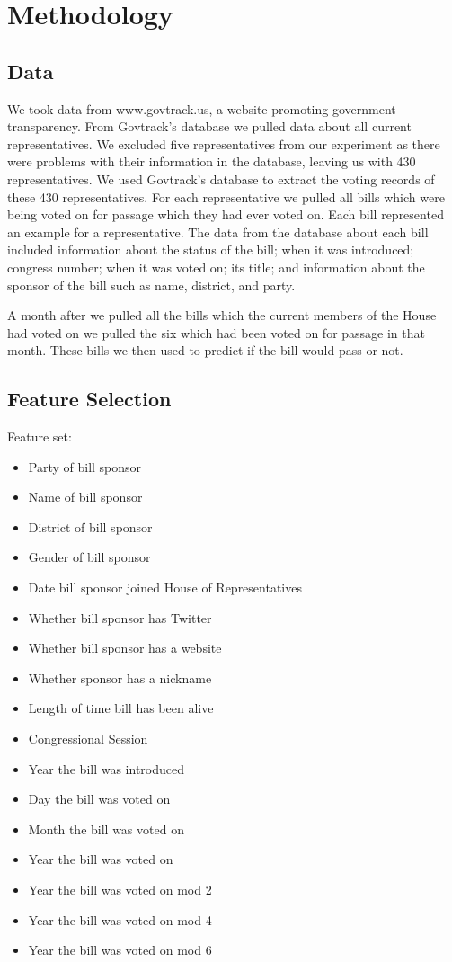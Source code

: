 \documentclass[11pt,letterpaper,twocolumn]{article}
\begin{document}
\section{Methodology}

\subsection{Data}

We took data from www.govtrack.us, a website promoting government transparency. From Govtrack's database we pulled data about all current representatives. We excluded five representatives from our experiment as there were problems with their information in the database, leaving us with 430 representatives. We used Govtrack's database to extract the voting records of these 430 representatives. For each representative we pulled all bills which were being voted on for passage which they had ever voted on. Each bill represented an example for a representative. The data from the database about each bill included information about the status of the bill; when it was introduced; congress number; when it was voted on; its title; and information about the sponsor of the bill such as name, district, and party. 

A month after we pulled all the bills which the current members of the House had voted on we pulled the six which had been voted on for passage in that month. These bills we then used to predict if the bill would pass or not.

\subsection{Feature Selection}
Feature set:
\begin{itemize}
\item Party of bill sponsor
\item Name of bill sponsor
\item District of bill sponsor
\item Gender of bill sponsor
\item Date bill sponsor joined House of Representatives
\item Whether bill sponsor has Twitter
\item Whether bill sponsor has a website
\item Whether sponsor has a nickname
\item Length of time bill has been alive
\item Congressional Session
\item Year the bill was introduced
\item Day the bill was voted on
\item Month the bill was voted on
\item Year the bill was voted on
\item Year the bill was voted on mod 2
\item Year the bill was voted on mod 4
\item Year the bill was voted on mod 6
\end{itemize}
\end{document}

